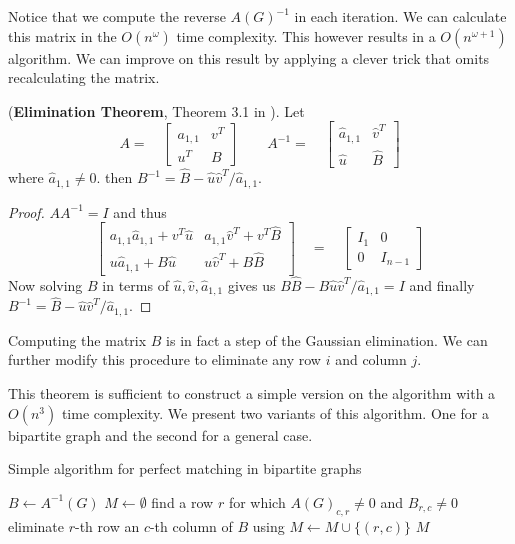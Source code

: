 Notice that we compute the reverse $A(G)^{-1}$ in each iteration. We can calculate this matrix in the $O(n^\omega)$ time complexity. This however results in a $O(n^{\omega+1})$ algorithm. We can improve on this result by applying a clever trick that omits recalculating the matrix.

\begin{theorem}\label{elimination_theorem}
(\textbf{Elimination Theorem}, Theorem 3.1 in \cite{mucha}). Let
\[
A=\quad
\begin{bmatrix}
a_{1,1} & v^T\\
u^T & B
\end{bmatrix}
\qquad
A^{-1}=\quad
\begin{bmatrix}
\hat a_{1,1} & \hat v^T\\
\hat u & \hat B
\end{bmatrix}
\]
where $\hat a_{1,1}\not=0$. then $B^{-1}=\hat B-\hat u\hat v^T/\hat a_{1,1}$.
\end{theorem}
\begin{proof}
$AA^{-1}=I$ and thus
\[
\begin{bmatrix}
a_{1,1}\hat a_{1,1}+v^T\hat u & a_{1,1}\hat v^T+v^T\hat B\\
u\hat a_{1,1}+B\hat u & u\hat v^T+B\hat B
\end{bmatrix}
\quad
=
\quad
\begin{bmatrix}
I_1 & 0\\
0 & I_{n-1}
\end{bmatrix}
\]
Now solving $B$ in terms of $\hat u,\hat v,\hat a_{1,1}$ gives us $B\hat B-B\hat u\hat v^T/\hat a_{1,1}=I$ and finally $B^{-1}=\hat B-\hat u\hat v^T/\hat a_{1,1}$.
\end{proof}
Computing the matrix $B$ is in fact a step of the Gaussian elimination. We can further modify this procedure to eliminate any row $i$ and column $j$.

This theorem is sufficient to construct a simple version on the algorithm with a $O(n^3)$ time complexity. We present two variants of this algorithm. One for a bipartite graph and the second for a general case.
\begin{algorithm}[H]
\caption{Simple algorithm for perfect matching in bipartite graphs}
\begin{algorithmic}[1]
\State $B \gets A^{-1}(G)$
\State $M \gets \emptyset$
    \State find a row $r$ for which $A(G)_{c,r}\not=0$ and $B_{r,c}\not=0$
    \State eliminate $r$-th row an $c$-th column of $B$ using 
    \State $M \gets M\cup\{(r,c)\}$
\EndFor
\State \Return $M$
\EndFunction
\end{algorithmic}
\end{algorithm}

